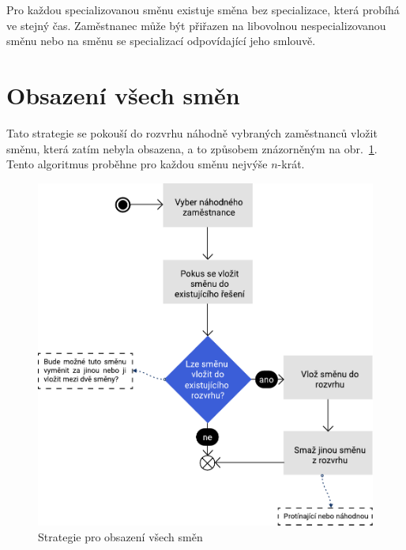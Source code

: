 \documentclass[twoside]{ctuthesis}
\begin{document}
Pro každou specializovanou směnu existuje směna bez specializace, která probíhá ve stejný čas. Zaměstnanec může být přiřazen na libovolnou nespecializovanou směnu nebo na směnu se specializací odpovídající jeho smlouvě.

\section{Obsazení všech směn}
Tato strategie se pokouší do rozvrhu náhodně vybraných zaměstnanců vložit směnu, která zatím nebyla obsazena, a to způsobem znázorněným na obr.~\ref{fig:noemptyshifts}. Tento algoritmus proběhne pro každou směnu nejvýše $n$-krát.

\begin{figure}
	\includegraphics[scale=0.7]{img/no-empty-shifts.pdf}
	\caption{Strategie pro obsazení všech směn}
	\label{fig:noemptyshifts}
\end{figure}


%
\end{document}
